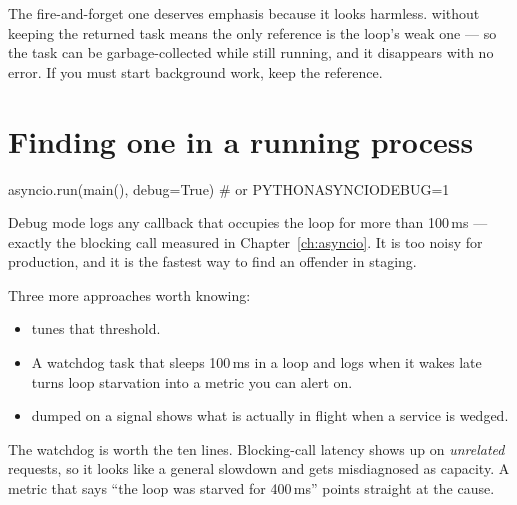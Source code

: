 \begin{warning}
The fire-and-forget one deserves emphasis because it looks harmless.
 without keeping the returned task means the only
reference is the loop's weak one --- so the task can be garbage-collected while
still running, and it disappears with no error. If you must start background
work, keep the reference.
\end{warning}

\section{Finding one in a running process}
\label{sec:debugging-async}

\begin{python}[caption={Ask the loop to complain}, label={lst:debug-mode}]
asyncio.run(main(), debug=True)      # or PYTHONASYNCIODEBUG=1
\end{python}

Debug mode logs any callback that occupies the loop for more than 100\,ms ---
exactly the blocking call measured in Chapter~\ref{ch:asyncio}. It is too noisy
for production, and it is the fastest way to find an offender in staging.

Three more approaches worth knowing:

\begin{itemize}[leftmargin=1.4em,nosep]
\item {} tunes that threshold.
\item A watchdog task that sleeps 100\,ms in a loop and logs when it wakes late
      turns loop starvation into a metric you can alert on.
\item {} dumped on a signal shows what is actually in
      flight when a service is wedged.
\end{itemize}

\begin{note}
The watchdog is worth the ten lines. Blocking-call latency shows up on
\emph{unrelated} requests, so it looks like a general slowdown and gets
misdiagnosed as capacity. A metric that says ``the loop was starved for 400\,ms''
points straight at the cause.
\end{note}

